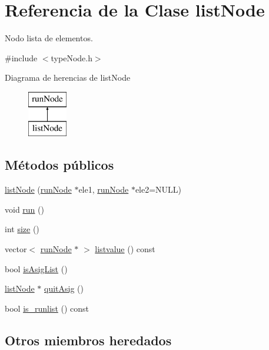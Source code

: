 \hypertarget{classlistNode}{\section{Referencia de la Clase list\-Node}
\label{classlistNode}
}


Nodo lista de elementos.  




{\ttfamily \#include $<$type\-Node.\-h$>$}

Diagrama de herencias de list\-Node\begin{figure}[H]
\begin{center}
\leavevmode
\includegraphics[height=2.000000cm]{classlistNode}
\end{center}
\end{figure}
\subsection*{Métodos públicos}
\begin{DoxyCompactItemize}
\item 
\hyperlink{classlistNode_ab518d74745655516bd8eeddef412678e}{list\-Node} (\hyperlink{classrunNode}{run\-Node} $\ast$ele1, \hyperlink{classrunNode}{run\-Node} $\ast$ele2=N\-U\-L\-L)
\item 
void \hyperlink{classlistNode_a27cfebeda882dbf8d3129ac0f6761835}{run} ()
\item 
int \hyperlink{classlistNode_aafdccbdea18f5e61503519c99007375d}{size} ()
\item 
vector$<$ \hyperlink{classrunNode}{run\-Node} $\ast$ $>$ \hyperlink{classlistNode_a781eda85c9775ae8a8bd9c29efb7199a}{listvalue} () const 
\item 
bool \hyperlink{classlistNode_a6dd4045f85a4405463b8ebd8b98b2b64}{is\-Asig\-List} ()
\item 
\hyperlink{classlistNode}{list\-Node} $\ast$ \hyperlink{classlistNode_a63dc73f986bde022c2b10160a0eb03fe}{quit\-Asig} ()
\item 
bool \hyperlink{classlistNode_a91043dbc59fa1d3ffe2e7447353e4745}{is\-\_\-runlist} () const 
\end{DoxyCompactItemize}
\subsection*{Otros miembros heredados}


